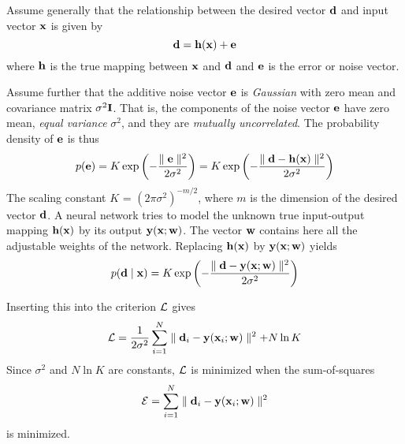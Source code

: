 \documentclass[10pt]{article}
\begin{document}
\begin{enumerate}
Assume generally that the relationship between the desired vector
${\bf d}$ and input vector ${\bf x}$ is given by
\[
{\bf d} = {\bf h}({\bf x}) + {\bf e}
\]
where ${\bf h}$ is the true mapping between ${\bf x}$ and ${\bf d}$
and ${\bf e}$ is the error or noise vector.


Assume further that the additive noise vector ${\bf e}$ is
{\em Gaussian} with zero mean and covariance matrix $\sigma^2 {\bf I}$.
That is, the components of the noise vector ${\bf e}$ have zero mean,
{\em equal variance} $\sigma^2$, and they are {\em mutually uncorrelated}.
The probability density of ${\bf e}$ is thus
\[
p({\bf e}) = K \exp \left( -\frac{ \parallel {\bf e} \parallel^2 }{2\sigma^2}
\right) = K \exp \left( -\frac{ \parallel {\bf d} - {\bf h}({\bf x})
\parallel^2}{2\sigma^2} \right)
\]
The scaling constant $K$ = $(2\pi \sigma^2)^{-m/2}$, where $m$ is
the dimension of the desired vector ${\bf d}$. A neural network tries to model the unknown true input-output
mapping ${\bf h}({\bf x})$ by its output ${\bf y}({\bf x};{\bf w})$.
The vector ${\bf w}$ contains here all the adjustable weights of the
network.
Replacing ${\bf h}({\bf x})$ by ${\bf y}({\bf x};{\bf w})$ yields
\[
p({\bf d} \mid {\bf x}) = K \exp \left( -\frac{ \parallel {\bf d}
-{\bf y}({\bf x};{\bf w}) \parallel^2 }{2\sigma^2} \right)
\]

Inserting this into the criterion ${\cal L}$ gives
\[
{\cal L} = \frac{1}{2\sigma^2} \sum_{i=1}^N \parallel {\bf d}_i
-{\bf y}({\bf x}_i;{\bf w}) \parallel^2 + N \ln K
\]
Since $\sigma^2$ and $N \ln K$ are constants, ${\cal L}$ is minimized
when the sum-of-squares
\[
{\cal E} = \sum_{i=1}^N \parallel {\bf d}_i -{\bf y}({\bf x}_i;{\bf w}) \parallel^2
\]
is minimized.



\end{enumerate}
\end{document}
